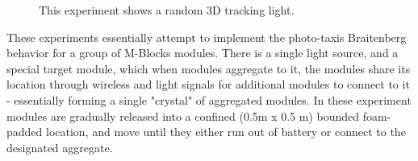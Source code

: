 \begin{figure}[h]
	\begin{subfigure}[b]{0.48\linewidth}
	\end{subfigure}
	\begin{subfigure}[b]{0.48\linewidth}
	\end{subfigure}
	
	\caption{This experiment shows a random 3D tracking light.}
	
	\label{fig:LightExperiment}
\end{figure}

These experiments essentially attempt to implement the photo-taxis Braitenberg behavior for a group of M-Blocks modules. There is a single light source, and a special target module, which when modules aggregate to it, the modules share its location through wireless and light signals for additional modules to connect to it - essentially forming a single "crystal" of aggregated modules. In these experiment modules are gradually released into a confined (0.5m x 0.5 m) bounded foam-padded location, and move until they either run out of battery or connect to the designated aggregate.

